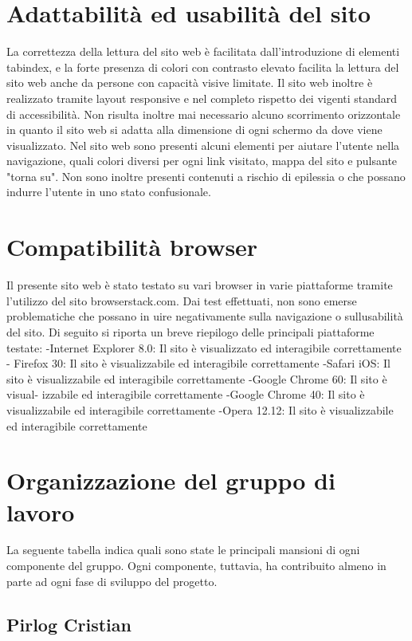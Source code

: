 \section{Adattabilità ed usabilità del sito}

La correttezza della lettura del sito web è facilitata dall'introduzione di elementi
tabindex, e la forte presenza di colori con contrasto elevato facilita la lettura del
sito web anche da persone con capacità visive limitate. Il sito web inoltre è realizzato 
tramite layout responsive e nel completo rispetto dei vigenti standard di
accessibilità.
Non risulta inoltre mai necessario alcuno scorrimento orizzontale in quanto il sito
web si adatta alla dimensione di ogni schermo da dove viene visualizzato. Nel
sito web sono presenti alcuni elementi per aiutare l'utente nella navigazione, quali
colori diversi per ogni link visitato, mappa del sito e pulsante "torna su". Non sono inoltre
presenti contenuti a rischio di epilessia o che possano indurre l'utente in uno stato
confusionale.

\section{Compatibilità browser}

Il presente sito web è stato testato su vari browser in varie piattaforme tramite l'utilizzo del sito browserstack.com. Dai test effettuati, non sono emerse problematiche che possano in
uire negativamente sulla navigazione o sullusabilità del sito.
Di seguito si riporta un breve riepilogo delle principali piattaforme testate:
-Internet Explorer 8.0: Il sito è visualizzato ed interagibile correttamente -
Firefox 30: Il sito è visualizzabile ed interagibile correttamente -Safari iOS: Il sito
è visualizzabile ed interagibile correttamente -Google Chrome 60: Il sito è visual-
izzabile ed interagibile correttamente -Google Chrome 40: Il sito è visualizzabile
ed interagibile correttamente -Opera 12.12: Il sito è visualizzabile ed interagibile
correttamente

\section{Organizzazione del gruppo di lavoro}

La seguente tabella indica quali sono state le principali mansioni di ogni componente
 del gruppo. Ogni componente, tuttavia, ha contribuito almeno in parte ad
ogni fase di sviluppo del progetto.

\subsection{Pirlog Cristian}

